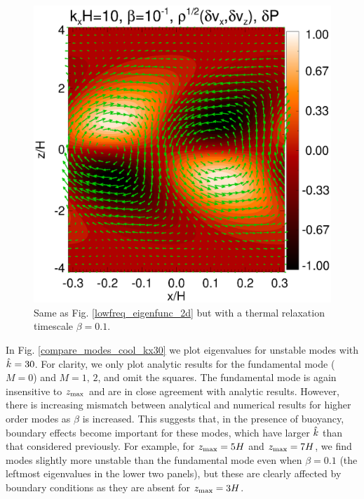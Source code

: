 \begin{figure}
  \includegraphics[width=\linewidth]{figures/result2d_cool}
  \caption{Same as  Fig. \ref{lowfreq_eigenfunc_2d} but with a thermal
    relaxation timescale $\beta=0.1$. 
    \label{lowfreq_eigenfunc_2d_cool}
  }
\end{figure}


In Fig. \ref{compare_modes_cool_kx30} we plot eigenvalues for unstable 
modes with $\hat{k}=30$. For clarity, we only plot analytic results 
for the fundamental mode ($M=0$) and $M=1,\,2$, and omit the 
squares. The fundamental mode is again insensitive to $z_\mathrm{max}$ and are
in close agreement with analytic results. However, 
there is increasing mismatch between analytical and numerical results
for higher order modes as $\beta$ is increased. This suggests that, in
the presence of buoyancy, boundary effects become important for these
modes, which have larger $\hat{k}$ than that considered previously. For
example, for $z_\mathrm{max}=5H$ and $z_\mathrm{max}=7H$, we 
find modes slightly more unstable than the fundamental
mode even when $\beta=0.1$ (the leftmost eigenvalues in the lower two
panels), but these are clearly affected by boundary
conditions as they are absent for $z_\mathrm{max}=3H$. 

